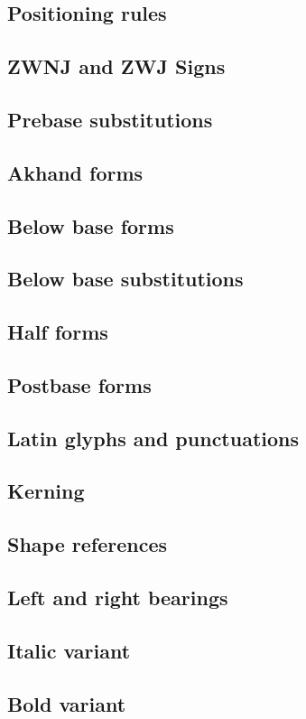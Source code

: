\subsection {Positioning rules} 
\subsection {ZWNJ and ZWJ Signs}
\subsection {Prebase substitutions}
\subsection {Akhand forms}
\subsection {Below base forms}
\subsection {Below base substitutions}
\subsection {Half forms}
\subsection {Postbase forms}
\subsection {Latin glyphs and punctuations}
\subsection {Kerning}
\subsection {Shape references}
\subsection {Left and right bearings}
\subsection {Italic variant}
\subsection {Bold variant}
